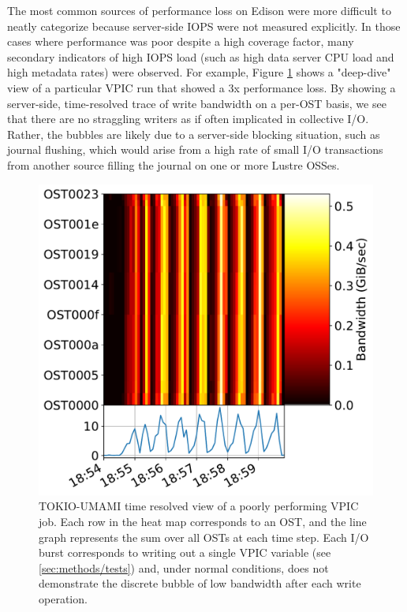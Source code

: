 \documentclass[conference,10pt,compsocconf]{IEEEtran}
\begin{document}
The most common sources of performance loss on Edison were more difficult to neatly categorize because server-side IOPS were not measured explicitly.  In those cases where performance was poor despite a high coverage factor, many secondary indicators of high IOPS load (such as high data server CPU load and high metadata rates) were observed.  For example, Figure \ref{fig:umami-deepdive} shows a "deep-dive" view of a particular VPIC run that showed a 3x performance loss.  By showing a server-side, time-resolved trace of write bandwidth on a per-OST basis, we see that there are no straggling writers as if often implicated in collective I/O.  Rather, the bubbles are likely due to a server-side blocking situation, such as journal flushing, which would arise from a high rate of small I/O transactions from another source filling the journal on one or more Lustre OSSes.

\begin{figure}[t]
    \centering
    \includegraphics[width=1.0\columnwidth]{figs/deepdive-scratch3-vpic-write_feb24.pdf}
    \caption{TOKIO-UMAMI time resolved view of a poorly performing VPIC job.  Each row in the heat map corresponds to an OST, and the line graph represents the sum over all OSTs at each time step.  Each I/O burst corresponds to writing out a single VPIC variable (see \ref{sec:methods/tests}) and, under normal conditions, does not demonstrate the discrete bubble of low bandwidth after each write operation.}
    \label{fig:umami-deepdive}
\end{figure}
\end{document}
